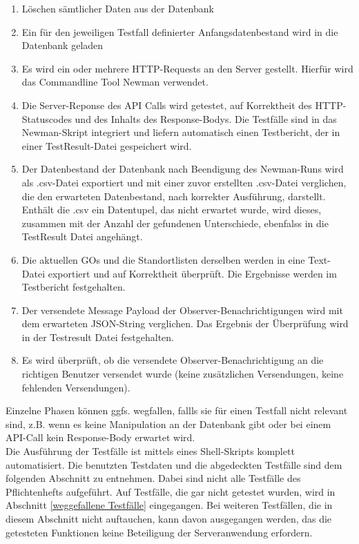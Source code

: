 \documentclass[11pt,a4paper]{scrartcl}
\begin{document}
\begin{enumerate}
	\item Löschen sämtlicher Daten aus der Datenbank
	\item Ein für den jeweiligen Testfall definierter Anfangsdatenbestand wird in die Datenbank geladen
	\item Es wird ein oder mehrere HTTP-Requests an den Server gestellt. Hierfür wird das Commandline Tool Newman verwendet.
	\item Die Server-Reponse des API Calls wird getestet, auf Korrektheit des HTTP-Statuscodes und des Inhalts des Response-Bodys. Die Testfälle sind in das Newman-Skript integriert und liefern automatisch einen Testbericht, der in einer TestResult-Datei gespeichert wird.
	\item Der Datenbestand der Datenbank nach Beendigung des Newman-Runs wird als .csv-Datei exportiert und mit einer zuvor erstellten .csv-Datei verglichen, die den erwarteten Datenbestand, nach korrekter Ausführung, darstellt. Enthält die .csv ein Datentupel, das nicht erwartet wurde,  wird dieses, zusammen mit der Anzahl der gefundenen Unterschiede, ebenfalss in die TestResult Datei angehängt.
	\item Die aktuellen GOs und die Standortlisten derselben werden in eine Text-Datei exportiert und auf Korrektheit überprüft. Die Ergebnisse werden im Testbericht festgehalten.
	\item Der versendete Message Payload der Observer-Benachrichtigungen wird mit dem erwarteten JSON-String verglichen. Das Ergebnis der Überprüfung wird in der Testresult Datei festgehalten.
	\item Es wird überprüft, ob die versendete Observer-Benachrichtigung an die richtigen Benutzer versendet wurde (keine zusätzlichen Versendungen, keine fehlenden Versendungen).
\end{enumerate}
Einzelne Phasen können ggfs. wegfallen, fallls sie für einen Testfall nicht relevant sind, z.B. wenn es keine Manipulation an der Datenbank gibt oder bei einem API-Call kein Response-Body erwartet wird.\\

Die Ausführung der Testfälle ist mittels eines Shell-Skripts komplett automatisiert. Die benutzten Testdaten und die abgedeckten Testfälle sind dem folgenden Abschnitt zu entnehmen. Dabei sind nicht alle Testfälle des Pflichtenhefts aufgeführt. Auf Testfälle, die gar nicht getestet wurden, wird in Abschnitt \ref{weggefallene Testfälle} eingegangen. Bei weiteren Testfällen, die in diesem Abschnitt nicht auftauchen, kann davon ausgegangen werden, das die getesteten Funktionen keine Beteiligung der Serveranwendung erfordern.\\
\end{document}
